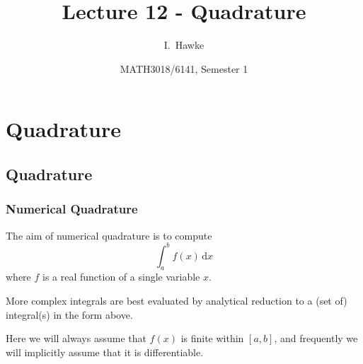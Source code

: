 \documentclass{beamer}
\title[Lecture 12] %
{Lecture 12 - Quadrature}
\author[I. Hawke] %
{I.~Hawke}
\institute[University of Southampton] %
{
  School of Mathematics, \\
  University of Southampton, UK
}
\date[Semester 1] %
{MATH3018/6141, Semester 1}
\begin{document}
\begin{frame}
  \titlepage
\end{frame}

\section{Quadrature}

\subsection{Quadrature}

\begin{frame}
  \frametitle{Numerical Quadrature}

  The aim of numerical quadrature is to compute
  \begin{equation*}
    \int_a^b f(x) \, \text{d}x
  \end{equation*}
  where $f$ is a real function of a single variable $x$. \pause

  \vspace{1ex}

  More complex integrals are best evaluated by analytical reduction to
  a (set of) integral(s) in the form above. \pause

  \vspace{1ex}

  Here we will always assume that $f(x)$ is finite within $[a, b]$,
  and frequently we will implicitly assume that it is differentiable.

\end{frame}
\end{document}

